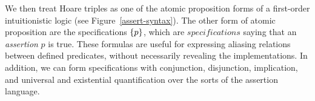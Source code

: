 \documentclass[preprint,natbib]{sigplanconf}
\begin{document}
We then treat Hoare triples as one of the atomic proposition forms of
a first-order intuitionistic logic (see
Figure~\ref{assert-syntax}). The other form of atomic proposition are
the specifications $\{{p}\}$, which are $specifications$ saying that
an \emph{assertion} $p$ is true. These formulas are useful for
expressing aliasing relations between defined predicates, without
necessarily revealing the implementations. In addition, we can form
specifications with conjunction, disjunction, implication, and
universal and existential quantification over the sorts of the
assertion language. 

% 
\end{document}

